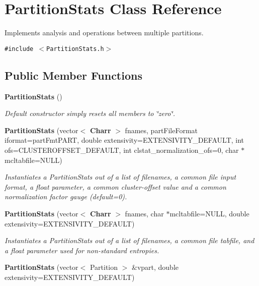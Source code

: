\section{Partition\-Stats Class Reference}
\label{classPartitionStats}
Implements analysis and operations between multiple partitions.  


{\tt \#include $<$Partition\-Stats.h$>$}

\subsection*{Public Member Functions}
\begin{CompactItemize}
\item 
{\bf Partition\-Stats} ()\label{classPartitionStats_a0}

\begin{CompactList}\small\item\em Default constructor simply resets all members to \char`\"{}zero\char`\"{}. \item\end{CompactList}\item 
{\bf Partition\-Stats} (vector$<$ {\bf Charr} $>$ fnames, part\-File\-Format iformat=part\-Fmt\-PART, double extensivity=EXTENSIVITY\_\-DEFAULT, int ofs=CLUSTEROFFSET\_\-DEFAULT, int clstat\_\-normalization\_\-ofs=0, char $\ast$mcltabfile=NULL)\label{classPartitionStats_a1}

\begin{CompactList}\small\item\em Instantiates a Partition\-Stats out of a list of filenames, a common file input format, a float parameter, a common cluster-offset value and a common normalization factor gauge (default=0). \item\end{CompactList}\item 
{\bf Partition\-Stats} (vector$<$ {\bf Charr} $>$ fnames, char $\ast$mcltabfile=NULL, double extensivity=EXTENSIVITY\_\-DEFAULT)\label{classPartitionStats_a2}

\begin{CompactList}\small\item\em Instantiates a Partition\-Stats out of a list of filenames, a common file tabfile, and a float parameter used for non-standard entropies. \item\end{CompactList}\item 
{\bf Partition\-Stats} (vector$<$ Partition $>$ \&vpart, double extensivity=EXTENSIVITY\_\-DEFAULT)\label{classPartitionStats_a3}


\end{CompactItemize}
